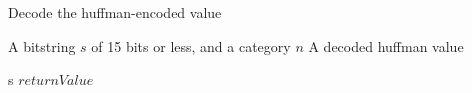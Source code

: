 \begin{algorithm}
\caption{Decode the huffman-encoded value}
\label{algDecodeHuffmanValue}
\begin{algorithmic}
\REQUIRE A bitstring $s$ of 15 bits or less, and a category $n$
\ENSURE A decoded huffman value

	\RETURN s
\ENDIF
{}
\RETURN $returnValue$
\end{algorithmic}
\end{algorithm}
